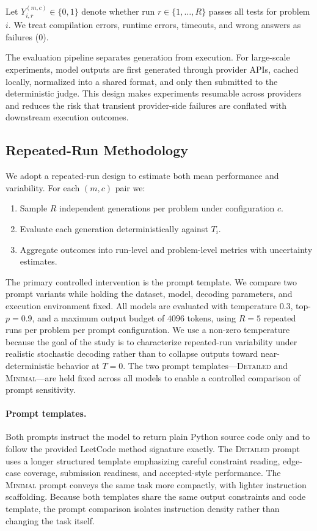 \documentclass[11pt]{article}
\begin{document}
Let $Y_{i,r}^{(m,c)} \in \{0,1\}$ denote whether run $r \in \{1,\dots,R\}$ passes all tests for problem $i$. We treat compilation errors, runtime errors, timeouts, and wrong answers as failures ($0$).

The evaluation pipeline separates generation from execution. For large-scale experiments, model outputs are first generated through provider APIs, cached locally, normalized into a shared format, and only then submitted to the deterministic judge. This design makes experiments resumable across providers and reduces the risk that transient provider-side failures are conflated with downstream execution outcomes.

\subsection{Repeated-Run Methodology}
We adopt a repeated-run design to estimate both mean performance and variability. For each $(m,c)$ pair we:
\begin{enumerate}
  \item Sample $R$ independent generations per problem under configuration $c$.
  \item Evaluate each generation deterministically against $T_i$.
  \item Aggregate outcomes into run-level and problem-level metrics with uncertainty estimates.
\end{enumerate}

The primary controlled intervention is the prompt template. We compare two prompt variants while holding the dataset, model, decoding parameters, and execution environment fixed. All models are evaluated with temperature $0.3$, top-$p=0.9$, and a maximum output budget of $4096$ tokens, using $R=5$ repeated runs per problem per prompt configuration. We use a non-zero temperature because the goal of the study is to characterize repeated-run variability under realistic stochastic decoding rather than to collapse outputs toward near-deterministic behavior at $T=0$. The two prompt templates---\textsc{Detailed} and \textsc{Minimal}---are held fixed across all models to enable a controlled comparison of prompt sensitivity.

\paragraph{Prompt templates.} Both prompts instruct the model to return plain Python source code only and to follow the provided LeetCode method signature exactly. The \textsc{Detailed} prompt uses a longer structured template emphasizing careful constraint reading, edge-case coverage, submission readiness, and accepted-style performance. The \textsc{Minimal} prompt conveys the same task more compactly, with lighter instruction scaffolding. Because both templates share the same output constraints and code template, the prompt comparison isolates instruction density rather than changing the task itself.
\end{document}
